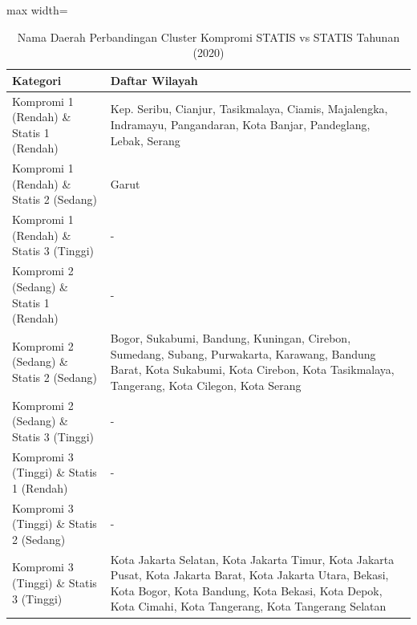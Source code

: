 \begin{table}[H]
\centering
\caption{Nama Daerah Perbandingan Cluster Kompromi STATIS vs STATIS Tahunan (2020)} \label{tab:app1comp_statis_name_2020}
\begin{adjustbox}{max width=\textwidth}
\begin{tabular}{|p{4cm}|p{10cm}|}
\hline
\textbf{Kategori} & \textbf{Daftar Wilayah} \\
\hline
Kompromi 1 (Rendah) \& Statis 1 (Rendah) & Kep. Seribu, Cianjur, Tasikmalaya, Ciamis, Majalengka, Indramayu, Pangandaran, Kota Banjar, Pandeglang, Lebak, Serang \\
\hline
Kompromi 1 (Rendah) \& Statis 2 (Sedang) & Garut \\
\hline
Kompromi 1 (Rendah) \& Statis 3 (Tinggi) & - \\
\hline
Kompromi 2 (Sedang) \& Statis 1 (Rendah) & - \\
\hline
Kompromi 2 (Sedang) \& Statis 2 (Sedang) & Bogor, Sukabumi, Bandung, Kuningan, Cirebon, Sumedang, Subang, Purwakarta, Karawang, Bandung Barat, Kota Sukabumi, Kota Cirebon, Kota Tasikmalaya, Tangerang, Kota Cilegon, Kota Serang \\
\hline
Kompromi 2 (Sedang) \& Statis 3 (Tinggi) & - \\
\hline
Kompromi 3 (Tinggi) \& Statis 1 (Rendah) & - \\
\hline
Kompromi 3 (Tinggi) \& Statis 2 (Sedang) & - \\
\hline
Kompromi 3 (Tinggi) \& Statis 3 (Tinggi) & Kota Jakarta Selatan, Kota Jakarta Timur, Kota Jakarta Pusat, Kota Jakarta Barat, Kota Jakarta Utara, Bekasi, Kota Bogor, Kota Bandung, Kota Bekasi, Kota Depok, Kota Cimahi, Kota Tangerang, Kota Tangerang Selatan \\
\hline
\end{tabular}
\end{adjustbox}
\end{table}